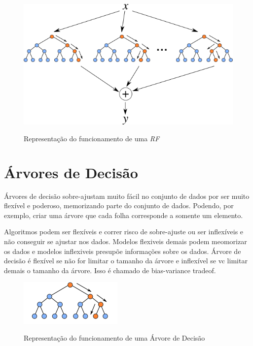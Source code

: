 \begin{figure}[h]
    \centering
    \includegraphics[scale=0.8]{monography/img/random_forest.png}
    \label{figure:rf}
    \caption{Representação do funcionamento de uma \textit{\acrshort{RF}}\footnotemark}
\end{figure}



\section{Árvores de Decisão}


Árvores de decisão sobre-ajustam muito fácil no conjunto de dados por ser muito flexível e poderoso, memorizando parte do conjunto de dados. Podendo, por exemplo, criar uma árvore que cada folha corresponde a somente um elemento.

 Algoritmos podem ser flexíveis e correr risco de sobre-ajuste ou ser inflexíveis e não conseguir se ajustar nos dados. Modelos flexiveis demais podem  meomorizar os dados e modelos inflexiveis presupõe informações sobre os dados.
 Árvore de decisão é flexível se não for limitar o tamanho da árvore e inflexível se vc limitar demais o tamanho da árvore. Isso é chamado de bias-variance tradeof.
 
 \begin{figure}[h]
    \centering
    \includegraphics[scale=1.5]{monography/img/decision_tree.png}
    \label{figure:rf}
    \caption{Representação do funcionamento de uma Árvore de Decisão\footnotemark}
\end{figure}

